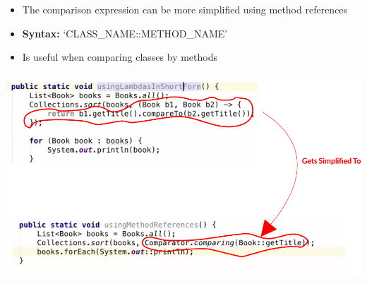 \documentclass[12pt]{article}
\begin{document}
\bigskip

\begin{itemize}
    \item The comparison expression can be more simplified using method references
    \item \textbf{Syntax:} `CLASS\_NAME::METHOD\_NAME'
    \item Is useful when comparing classes by methods
\end{itemize}

\begin{center}
\includegraphics[width=\linewidth]{images/part_1_notes_5.png}
\end{center}
\end{document}
